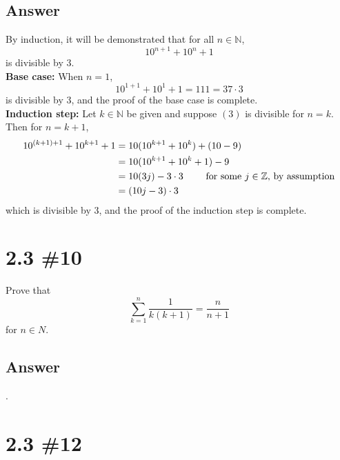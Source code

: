 \documentclass[
	12pt, %
]{fphw}
\newcommand\qed{\text{$\blacksquare$}}
\newcommand\Z{\mathbb{Z}}
\newcommand\N{\mathbb{N}}
\begin{document}
\subsection*{Answer} By induction, it will be demonstrated that for all $n \in \N{}$,
\begin{equation}
10^{n+1} + 10^n + 1
\end{equation}
is divisible by 3.\\
\textbf{Base case:} When $n = 1$,
$$
10^{1+1} + 10^1 + 1 = 111 = 37 \cdot 3
$$
is divisible by 3, and the proof of the base case is complete. \\
\textbf{Induction step:} Let $k \in \N{}$ be given and suppose $(3)$ is divisible for $n = k$. Then for $n = k+1$,
\begin{align*}
10^{(k+1)+1} + 10^{k+1} + 1 &= 10(10^{k+1} + 10^k) + (10 - 9) \\
&=10(10^{k+1} + 10^k + 1) - 9 \\
&= 10 (3j) - 3 \cdot 3 \hspace{20 pt} \text{ for some $j \in \Z{}$, by assumption}\\
&= (10j - 3)\cdot 3
\end{align*}
which is divisible by 3, and the proof of the induction step is complete. \qed


\section*{2.3 \#10}

\begin{problem}
Prove that
$$
\sum^n_{k = 1} \frac{1}{k(k+1)} = \frac{n}{n+1}
$$
for $n \in N{}$.
\end{problem}


\subsection*{Answer} .\\



\section*{2.3 \#12}
\end{document}
